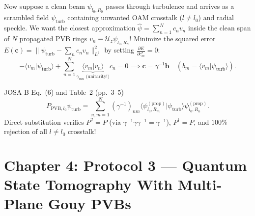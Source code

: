 \documentclass[10pt,letterpaper]{article}
\newcommand{\braket}[2]{\langle #1 | #2 \rangle}
\newcommand{\norm}[1]{\lVert #1 \rVert}
\numberwithin{equation}{section}
\begin{document}
Now suppose a clean beam $\psi_{l_0,R_0}$ passes through turbulence and arrives as a scrambled field $\psi_{\mathrm{turb}}$ containing unwanted OAM crosstalk ($l \neq l_0$) and radial speckle. We want the closest approximation $\hat{\psi} = \sum_{n=1}^N c_n v_n$ inside the clean span of $N$ propagated PVB rings $v_n \equiv \mathcal{U}_z\psi_{l_0,R_n}$! Minimize the squared error $E(\mathbf{c}) = \norm{\psi_{\mathrm{turb}} - \sum_n c_n v_n}_{L^2}^2$ by setting $\frac{\partial E}{\partial c_m^*} = 0$:
\begin{equation}
  -\braket{v_m}{\psi_{\mathrm{turb}}} + \sum_{n=1}^N \underbrace{\braket{v_m}{v_n}}_{\gamma_{mn}\text{ (unitarity!)}} c_n = 0
  \implies \mathbf{c} = \gamma^{-1}\mathbf{b} \quad (b_m = \braket{v_m}{\psi_{\mathrm{turb}}}).
\end{equation}

\begin{paperhit}{JOSA B Eq.~(6) and Table~2 (pp.~3--5)}
\[
  P_{\mathrm{PVB},l_0}\psi_{\mathrm{turb}} = \sum_{n,m=1}^N (\gamma^{-1})_{nm}\braket{\psi_{l_0,R_m}^{(\mathrm{prop})}}{\psi_{\mathrm{turb}}}\psi_{l_0,R_n}^{(\mathrm{prop})}.
\]
Direct substitution verifies $P^2 = P$ (via $\gamma^{-1}\gamma\gamma^{-1} = \gamma^{-1}$), $P^\dagger = P$, and $100\%$ rejection of all $l \neq l_0$ crosstalk!
\end{paperhit}

\section{Chapter 4: Protocol 3 --- Quantum State Tomography With Multi-Plane Gouy PVBs}
\label{sec:b_c4}
\end{document}
